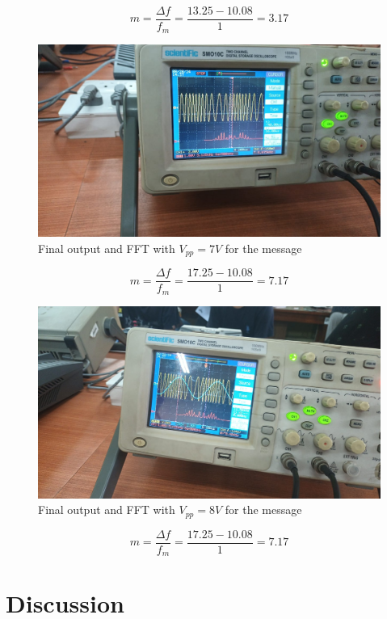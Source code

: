 \documentclass{article}
\begin{document}
\begin{equation}
    m=\frac{\Delta f}{f_m}=\frac{13.25-10.08}{1}=3.17
\end{equation}
\begin{figure}[!ht]
\includegraphics[width=\textwidth]{V_pp_m_7V.jpeg}
\caption{Final output and FFT with $V_{pp}=7V$ for the message}
\label{fig:V_pp_m_7V}
\end{figure}
\begin{equation}
    m=\frac{\Delta f}{f_m}=\frac{17.25-10.08}{1}=7.17
\end{equation}
\begin{figure}[!ht]
\includegraphics[width=\textwidth]{V_pp_m_8V.jpeg}
\caption{Final output and FFT with $V_{pp}=8V$ for the message}
\label{fig:V_pp_m_8V}
\end{figure}
\begin{equation}
    m=\frac{\Delta f}{f_m}=\frac{17.25-10.08}{1}=7.17
\end{equation}


\clearpage
\section{Discussion}
\end{document}
